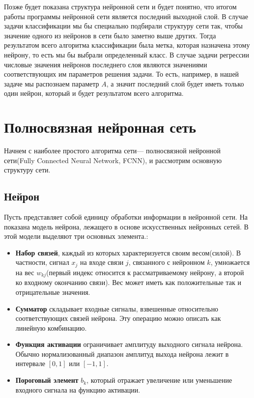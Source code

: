 \documentclass[12pt, a4paper]{article}
\begin{document}
 	Позже будет показана структура нейронной сети и будет понятно, что итогом работы программы нейронной сети является последний выходной слой. В случае задачи классификации мы бы специально подбирали структуру сети так, чтобы значение одного из нейронов в сети было заметно выше других. Тогда результатом всего алгоритма классификации была метка, которая назначена этому нейрону, то есть мы бы выбрали определенный класс. В случае задачи регрессии числовые значения нейронов последнего слоя являются значениями соответствующих им параметров решения задачи. То есть, например, в нашей задаче мы распознаем параметр $A$, а значит последний слой будет иметь только один нейрон, который и будет результатом всего алгоритма.
	\section{Полносвязная нейронная сеть}
	Начнем с наиболее простого алгоритма сети--- полносвязной нейронной сети(Fully Connected Neural Network, FCNN), и рассмотрим основную структуру сети. 
	

	\subsection{Нейрон}
	Пусть представляет собой единицу обработки информации в нейронной сети. На показана модель нейрона, лежащего в основе искусственных нейронных сетей. В этой модели выделяют три основных элемента\cite[см. стр.~40-41]{2}.:
	\begin{itemize}
		\item \textbf{Набор связей}, каждый из которых характеризуется своим весом(силой). В частности, сигнал $x_j$ на входе связи $j$, связанного с нейронном $k$, умножается на вес $w_{kj}$(первый индекс относится к рассматриваемому нейрону, а второй ко входному окончанию связи). Вес может иметь как положительные так и отрицательные значения.
		\item \textbf{Сумматор} складывает входные сигналы, взвешенные относительно соответствующих связей нейрона. Эту операцию можно описать как линейную комбинацию.
		\item \textbf{Функция активации} ограничивает амплитуду выходного сигнала нейрона. Обычно нормализованный диапазон амплитуд выхода нейрона лежит в интервале $[0, 1]$ или $[-1, 1]$.
		\item \textbf{Пороговый элемент} $b_k$, который отражает увеличение или уменьшение входного сигнала на функцию активации.
	\end{itemize}
	
\end{document}
